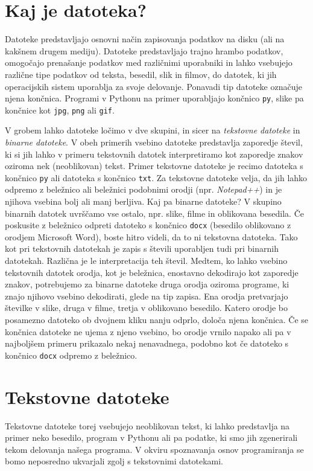 \section{Kaj je datoteka?}

Datoteke predstavljajo osnovni način zapisovanja podatkov na disku (ali na kakšnem drugem mediju). Datoteke predstavljajo trajno hrambo podatkov, omogočajo prenašanje podatkov med različnimi uporabniki in lahko vsebujejo različne tipe podatkov od teksta, besedil, slik in filmov, do datotek, ki jih operacijskih sistem uporablja za svoje delovanje. Ponavadi tip datoteke označuje njena končnica. Programi v Pythonu na primer uporabljajo končnico \texttt{py}, slike pa končnice kot \texttt{jpg}, \texttt{png} ali \texttt{gif}. 

V grobem lahko datoteke ločimo v dve skupini, in sicer na \emph{tekstovne datoteke} in \emph{binarne datoteke}. V obeh primerih vsebino datoteke predstavlja zaporedje števil, ki si jih lahko v primeru tekstovnih datotek interpretiramo kot zaporedje znakov oziroma nek (neoblikovan) tekst. Primer tekstovne datoteke je recimo datoteka s končnico \texttt{py} ali datoteka s končnico \texttt{txt}. Za tekstovne datoteke velja, da jih lahko odpremo z beležnico ali beležnici podobnimi orodji (npr. \emph{Notepad++}) in je njihova vsebina bolj ali manj berljiva. Kaj pa binarne datoteke? V skupino binarnih datotek uvrščamo vse ostalo, npr. slike, filme in oblikovana besedila. Če poskusite z beležnico odpreti datoteko s končnico \texttt{docx} (besedilo oblikovano z orodjem Microsoft Word), boste hitro videli, da to ni tekstovna datoteka. Tako kot pri tekstovnih datotekah je zapis s števili uporabljen tudi pri binarnih datotekah. Različna je le interpretacija teh števil. Medtem, ko lahko vsebino tekstovnih datotek orodja, kot je beležnica, enostavno dekodirajo kot zaporedje znakov, potrebujemo za binarne datoteke druga orodja oziroma programe, ki znajo njihovo vsebino dekodirati, glede na tip zapisa. Ena orodja pretvarjajo številke v slike, druga v filme, tretja v oblikovano besedilo. Katero orodje bo posamezno datoteko ob dvojnem kliku nanju odprlo, določa njena končnica. Če se končnica datoteke ne ujema z njeno vsebino, bo orodje vrnilo napako ali pa v najboljšem primeru prikazalo nekaj nenavadnega, podobno kot če datoteko s končnico \texttt{docx} odpremo z beležnico. 

\section{Tekstovne datoteke}
Tekstovne datoteke torej vsebujejo neoblikovan tekst, ki lahko predstavlja na primer neko besedilo, program v Pythonu ali pa podatke, ki smo jih zgenerirali tekom delovanja našega programa. V okviru spoznavanja osnov programiranja se bomo neposredno ukvarjali zgolj s tekstovnimi datotekami. 

